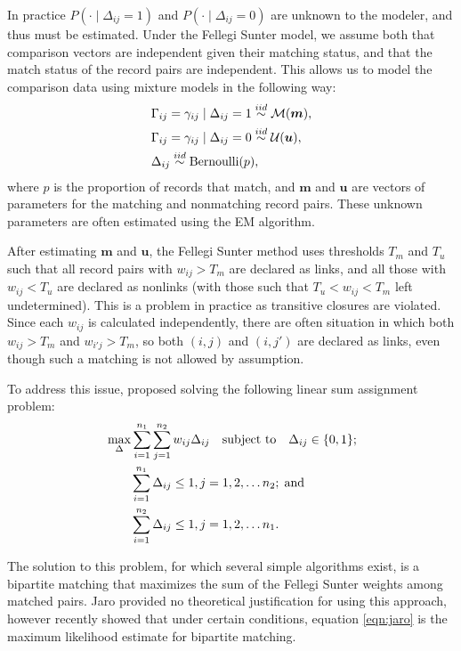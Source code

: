 \documentclass[12pt,letterpaper]{article}
\newcommand{\1}[1]{\mathbb{I}\!\left[#1\right]} %
\begin{document}
In practice $P(\cdot \mid \Delta_{ij} = 1)$ and $P(\cdot \mid \Delta_{ij} = 0)$ are unknown to the modeler, and thus must be estimated. Under the Fellegi Sunter model, we assume both that comparison vectors are independent given their matching status, and that the match status of the record pairs are independent. This allows us to model 
the comparison data using mixture models in the following way:
\begin{align}
	&\Gamma_{ij} = \gamma_{ij} \mid \Delta_{ij} = 1 \stackrel{iid}{\sim} \mathcal{M}(\bm{m}), \\
	&\Gamma_{ij} = \gamma_{ij} \mid \Delta_{ij} = 0  \stackrel{iid}{\sim} \mathcal{U}(\bm{u}), \notag\\
	& \Delta_{ij}   \stackrel{iid}{\sim} \text{Bernoulli}(p), \notag
\end{align}
where $p$ is the proportion of records that match, and $\bm{m}$ and $\bm{u}$ are vectors of parameters for the matching and nonmatching record pairs. These unknown parameters are often estimated using the EM algorithm. 

After estimating $\bm{m}$ and $\bm{u}$, the Fellegi Sunter method uses thresholds $T_m$ and $T_u$ such that all record pairs with $w_{ij} > T_m$ are declared as links, and all those with $w_{ij} < T_u$ are declared as nonlinks (with those such that $T_u < w_{ij} < T_m$ left undetermined). This is a problem in practice as transitive closures are violated. Since each $w_{ij}$ is calculated independently, there are often situation in which both $w_{ij} > T_m$ and $w_{i'j} > T_m$, so both $(i,j)$ and $(i, j')$ are declared as links, even though such a matching is not allowed by assumption. 

To address this issue, \cite{jaro1989} proposed solving the following linear sum assignment problem:
\begin{align}
	\label{eqn:jaro}
	&\max_{\Delta} \sum_{i=1}^{n_1} \sum_{j=1}^{n_2} w_{ij} \Delta_{ij} 
	\quad \text{subject to} \quad \Delta_{ij} \in \{0,1\}; \\
	& \quad \quad \sum_{i=1}^{n_1}  \Delta_{ij}  \leq 1, j=1,2, \ldots n_2; \; \text{and} \notag\\
	& \quad \quad\sum_{i=1}^{n_2}  \Delta_{ij}  \leq 1, j=1,2, \ldots n_1. \notag
\end{align}

The solution to this problem, for which several simple algorithms exist, is a bipartite matching that maximizes the sum of the Fellegi Sunter weights among matched pairs. Jaro provided no theoretical justification for using this approach, however \cite{sadinle_bayesian_2017} recently showed that under certain conditions, equation \ref{eqn:jaro} is the maximum likelihood estimate for bipartite matching. 
\end{document}
